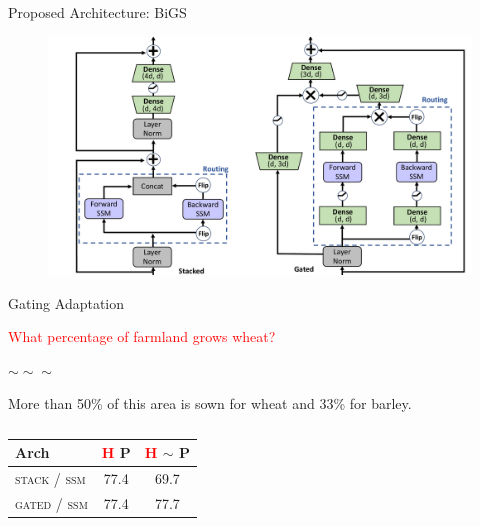 \documentclass[14pt,aspectratio=169]{beamer}
\begin{document}
\begin{frame}{Proposed Architecture: BiGS}
\begin{figure}
    \centering
    \includegraphics[height=0.7\textheight,trim={16cm 0 0 0},clip]{Figs/model_architecture_comparison2.pdf}
    \caption{}
    \label{fig:my_label}
\end{figure}
\end{frame}

\begin{frame}{Gating Adaptation}
   \centerline{\textcolor{red}{What percentage of farmland grows wheat?}}
    
    \centerline{$\sim \sim \sim $}

    \centerline{\textcolor{olivegreen}{More than 50\% of this area is sown for wheat and 33\% for barley.}}


    \begin{table}[t]
\center
    \begin{tabular}{lcc}
    \toprule
    \centering
     Arch  & \textcolor{red}{H} P &   \textcolor{red}{H} $\sim$ P \\      
    \midrule
               \textsc{stack} / \textsc{ssm} & 77.4 &  69.7\\
         \textsc{gated} / \textsc{ssm} & 77.4 &  77.7\\
    \bottomrule
    \end{tabular}
    \caption{ }
    \label{tab:synthetic}
\end{table}
\pause 


\end{frame}
\end{document}
